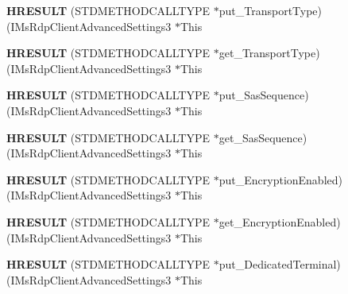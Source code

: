 \begin{DoxyCompactItemize}
{\bfseries H\+R\+E\+S\+U\+LT} (S\+T\+D\+M\+E\+T\+H\+O\+D\+C\+A\+L\+L\+T\+Y\+PE $\ast$put\+\_\+\+Transport\+Type)(I\+Ms\+Rdp\+Client\+Advanced\+Settings3 $\ast$This
\item 
\mbox{\label{struct_i_ms_rdp_client_advanced_settings3_vtbl_a98bf659d1d7db34860bbd9df5bc8ccf2}} 
{\bfseries H\+R\+E\+S\+U\+LT} (S\+T\+D\+M\+E\+T\+H\+O\+D\+C\+A\+L\+L\+T\+Y\+PE $\ast$get\+\_\+\+Transport\+Type)(I\+Ms\+Rdp\+Client\+Advanced\+Settings3 $\ast$This
\item 
\mbox{\label{struct_i_ms_rdp_client_advanced_settings3_vtbl_a0514a525ddaee795a6bf5049e18a0baa}} 
{\bfseries H\+R\+E\+S\+U\+LT} (S\+T\+D\+M\+E\+T\+H\+O\+D\+C\+A\+L\+L\+T\+Y\+PE $\ast$put\+\_\+\+Sas\+Sequence)(I\+Ms\+Rdp\+Client\+Advanced\+Settings3 $\ast$This
\item 
\mbox{\label{struct_i_ms_rdp_client_advanced_settings3_vtbl_ac19fda0e818dfc0a7fde51cdd1aaf5d2}} 
{\bfseries H\+R\+E\+S\+U\+LT} (S\+T\+D\+M\+E\+T\+H\+O\+D\+C\+A\+L\+L\+T\+Y\+PE $\ast$get\+\_\+\+Sas\+Sequence)(I\+Ms\+Rdp\+Client\+Advanced\+Settings3 $\ast$This
\item 
\mbox{\label{struct_i_ms_rdp_client_advanced_settings3_vtbl_abfd8ef272f58d65f782efec417bbb51b}} 
{\bfseries H\+R\+E\+S\+U\+LT} (S\+T\+D\+M\+E\+T\+H\+O\+D\+C\+A\+L\+L\+T\+Y\+PE $\ast$put\+\_\+\+Encryption\+Enabled)(I\+Ms\+Rdp\+Client\+Advanced\+Settings3 $\ast$This
\item 
\mbox{\label{struct_i_ms_rdp_client_advanced_settings3_vtbl_aeb2047b38db7ade4e738b94bdd650b86}} 
{\bfseries H\+R\+E\+S\+U\+LT} (S\+T\+D\+M\+E\+T\+H\+O\+D\+C\+A\+L\+L\+T\+Y\+PE $\ast$get\+\_\+\+Encryption\+Enabled)(I\+Ms\+Rdp\+Client\+Advanced\+Settings3 $\ast$This
\item 
\mbox{\label{struct_i_ms_rdp_client_advanced_settings3_vtbl_afb4e08dbf5d796c42cd6a1830b7ffe7b}} 
{\bfseries H\+R\+E\+S\+U\+LT} (S\+T\+D\+M\+E\+T\+H\+O\+D\+C\+A\+L\+L\+T\+Y\+PE $\ast$put\+\_\+\+Dedicated\+Terminal)(I\+Ms\+Rdp\+Client\+Advanced\+Settings3 $\ast$This
\item 

\end{DoxyCompactItemize}
